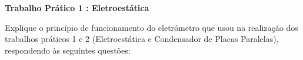 \question[25]
\textbf{Trabalho Pr\'{a}tico 1 : Eletroest\'{a}tica}

Explique o princ\'{i}pio de funcionamento do eletr\'{o}metro que usou na realiza\c{c}\~{a}o dos trabalhos pr\'{a}ticos 1 e 2 (Eletroest\'{a}tica e Condensador de Placas Paralelas), respondendo \`{a}s seguintes quest\~{o}es:
